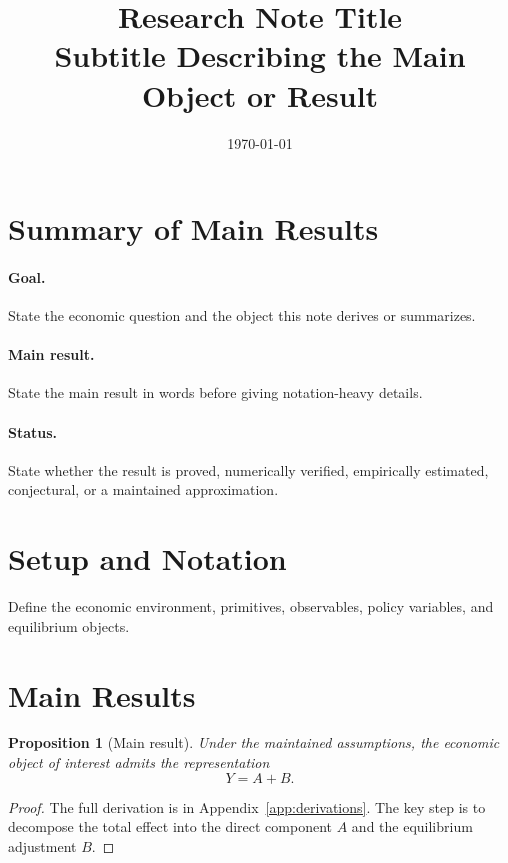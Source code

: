 \documentclass[11pt]{article}
\title{\textbf{Research Note Title}\\[0.5em]
\large Subtitle Describing the Main Object or Result}
\author{}
\date{\today}
\numberwithin{equation}{section}
\newtheorem{proposition}[theorem]{Proposition}
\theoremstyle{definition}
\theoremstyle{remark}
\newcommand{\1}{\mathds{1}}
\begin{document}
\maketitle

\section{Summary of Main Results}\label{sec:summary}

\paragraph{Goal.}
State the economic question and the object this note derives or summarizes.

\paragraph{Main result.}
State the main result in words before giving notation-heavy details.

\paragraph{Status.}
State whether the result is proved, numerically verified, empirically estimated, conjectural, or a maintained approximation.

\section{Setup and Notation}\label{sec:setup}

Define the economic environment, primitives, observables, policy variables, and equilibrium objects.

\section{Main Results}\label{sec:main-results}

\begin{proposition}[Main result]\label{prop:main}
Under the maintained assumptions, the economic object of interest admits the representation
\begin{equation}\label{eq:main-representation}
  Y = A + B.
\end{equation}
\end{proposition}

\begin{proof}
The full derivation is in Appendix~\ref{app:derivations}. The key step is to decompose the total effect into the direct component \(A\) and the equilibrium adjustment \(B\).
\end{proof}
\end{document}
